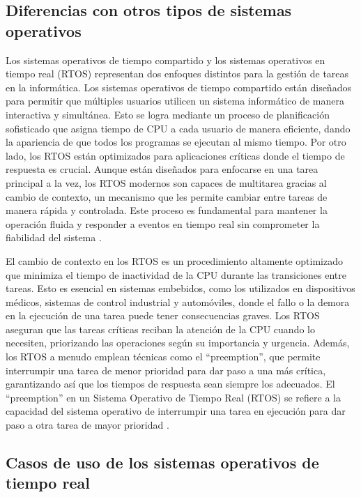 \documentclass{article}
\begin{document}
\newpage

\subsection{Diferencias con otros tipos de sistemas operativos}

Los sistemas operativos de tiempo compartido y los sistemas operativos en tiempo real (RTOS) representan dos
enfoques distintos para la gestión de tareas en la informática. Los sistemas operativos de tiempo compartido están
diseñados para permitir que múltiples usuarios utilicen un sistema informático de manera interactiva y simultánea.
Esto se logra mediante un proceso de planificación sofisticado que asigna tiempo de CPU a cada usuario de manera
eficiente, dando la apariencia de que todos los programas se ejecutan al mismo tiempo. Por otro lado, los RTOS
están optimizados para aplicaciones críticas donde el tiempo de respuesta es crucial. Aunque están diseñados para
enfocarse en una tarea principal a la vez, los RTOS modernos son capaces de multitarea gracias al cambio de
contexto, un mecanismo que les permite cambiar entre tareas de manera rápida y controlada. Este proceso es
fundamental para mantener la operación fluida y responder a eventos en tiempo real sin comprometer la fiabilidad
del sistema \cite{ref4} \cite{ref9}.

El cambio de contexto en los RTOS es un procedimiento altamente optimizado que minimiza el tiempo de
inactividad de la CPU durante las transiciones entre tareas. Esto es esencial en sistemas embebidos, como los
utilizados en dispositivos médicos, sistemas de control industrial y automóviles, donde el fallo o la demora en la
ejecución de una tarea puede tener consecuencias graves. Los RTOS aseguran que las tareas críticas reciban la
atención de la CPU cuando lo necesiten, priorizando las operaciones según su importancia y urgencia. Además, los
RTOS a menudo emplean técnicas como el “preemption”, que permite interrumpir una tarea de menor prioridad
para dar paso a una más crítica, garantizando así que los tiempos de respuesta sean siempre los adecuados.
El “preemption” en un Sistema Operativo de Tiempo Real (RTOS) se refiere a la capacidad del sistema operativo
de interrumpir una tarea en ejecución para dar paso a otra tarea de mayor prioridad \cite{ref2} \cite{ref5} \cite{ref6}.


\subsection{Casos de uso de los sistemas operativos de tiempo real}
\end{document}
